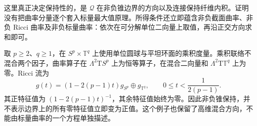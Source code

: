 这里真正决定保持性的，是 \(\mathcal Q\) 在非负锥边界的方向以及连接保持纤维内积。证明没有把曲率分量逐个套入标量最大值原理。所得条件还立即蕴含非负截面曲率、非负 Ricci 曲率及非负标量曲率：依次在可分解单位二向量上取值，再沿正交方向求和即可。

\begin{example}\label{g3:exm:ricci-flow-product-curvature-cone}
	取 \(p\ge2\)、\(q\ge1\)，在 \(S^p\times\mathbb T^q\) 上使用单位圆球与平坦环面的乘积度量。乘积联络不混合两个因子，曲率算子在 \(\Lambda^2\mathrm TS^p\) 上为恒等算子，在混合二向量和 \(\Lambda^2\mathrm T\mathbb T^q\) 上为零。Ricci 流为
	\[
		g(t)=(1-2(p-1)t)g_{S^p}\oplus g_{\mathbb T^q},
		\qquad 0\le t<\frac1{2(p-1)}.
	\]
	其正特征值为 \((1-2(p-1)t)^{-1}\)，其余特征值始终为零。因此非负锥保持，并不表示边界上的所有零特征值立即变为正值。这个例子也保留了高维混合方向，不能由标量曲率的一个方程单独描述。
\end{example}
